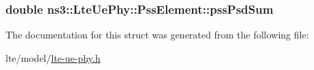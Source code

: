 \subsubsection[{\texorpdfstring{pss\+Psd\+Sum}{pssPsdSum}}]{\setlength{\rightskip}{0pt plus 5cm}double ns3\+::\+Lte\+Ue\+Phy\+::\+Pss\+Element\+::pss\+Psd\+Sum}\hypertarget{structns3_1_1LteUePhy_1_1PssElement_a587f24d8a712b341a86a9b35d9a13956}{}\label{structns3_1_1LteUePhy_1_1PssElement_a587f24d8a712b341a86a9b35d9a13956}


The documentation for this struct was generated from the following file\+:\begin{DoxyCompactItemize}
\item 
lte/model/\hyperlink{lte-ue-phy_8h}{lte-\/ue-\/phy.\+h}\end{DoxyCompactItemize}
